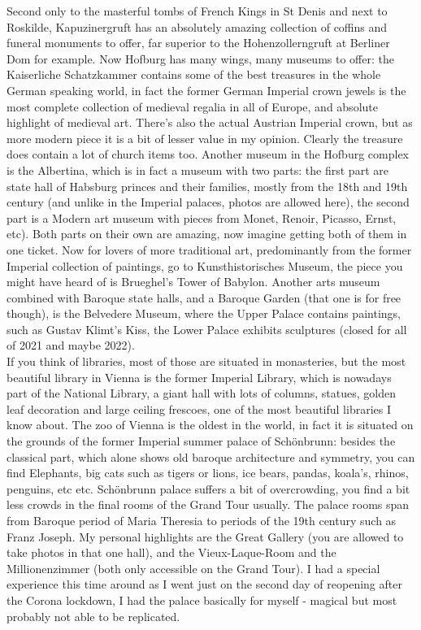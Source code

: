 Second only to the masterful tombs of French Kings in St Denis and next to Roskilde, Kapuzinergruft has an absolutely amazing collection of coffins and funeral monuments to offer, far superior to the Hohenzollerngruft at Berliner Dom for example. Now Hofburg has many wings, many museums to offer: the Kaiserliche Schatzkammer contains some of the best treasures in the whole German speaking world, in fact the former German Imperial crown jewels is the most complete collection of medieval regalia in all of Europe, and absolute highlight of medieval art. There's also the actual Austrian Imperial crown, but as more modern piece it is a bit of lesser value in my opinion. Clearly the treasure does contain a lot of church items too. Another museum in the Hofburg complex is the Albertina, which is in fact a museum with two parts: the first part are state hall of Habsburg princes and their families, mostly from the 18th and 19th century (and unlike in the Imperial palaces, photos are allowed here), the second part is a Modern art museum with pieces from Monet, Renoir, Picasso, Ernst, etc). Both parts on their own are amazing, now imagine getting both of them in one ticket. Now for lovers of more traditional art, predominantly from the former Imperial collection of paintings, go to Kunsthistorisches Museum, the piece you might have heard of is Brueghel's Tower of Babylon. Another arts museum combined with Baroque state halls, and a Baroque Garden (that one is for free though), is the Belvedere Museum, where the Upper Palace contains paintings, such as Gustav Klimt's Kiss, the Lower Palace exhibits sculptures (closed for all of 2021 and maybe 2022). \\
If you think of libraries, most of those are situated in monasteries, but the most beautiful library in Vienna is the former Imperial Library, which is nowadays part of the National Library, a giant hall with lots of columns, statues, golden leaf decoration and large ceiling frescoes, one of the most beautiful libraries I know about. The zoo of Vienna is the oldest in the world, in fact it is situated on the grounds of the former Imperial summer palace of Sch\"onbrunn: besides the classical part, which alone shows old baroque architecture and symmetry, you can find Elephants, big cats such as tigers or lions, ice bears, pandas, koala's, rhinos, penguins, etc etc. Sch\"onbrunn palace suffers a bit of overcrowding, you find a bit less crowds in the final rooms of the Grand Tour usually. The palace rooms span from Baroque period of Maria Theresia to periods of the 19th century such as Franz Joseph. My personal highlights are the Great Gallery (you are allowed to take photos in that one hall), and the Vieux-Laque-Room and the Millionenzimmer (both only accessible on the Grand Tour). I had a special experience this time around as I went just on the second day of reopening after the Corona lockdown, I had the palace basically for myself - magical but most probably not able to be replicated.\\
